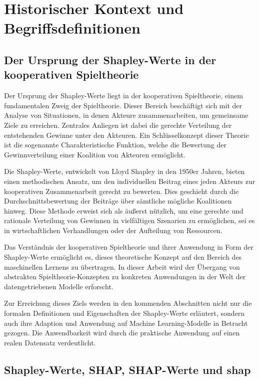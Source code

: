 \chapter{Historischer Kontext und Begriffsdefinitionen}



\section{Der Ursprung der Shapley-Werte in der kooperativen Spieltheorie}

Der Ursprung der Shapley-Werte liegt in der kooperativen Spieltheorie, einem fundamentalen Zweig der Spieltheorie. 
Dieser Bereich beschäftigt sich mit der Analyse von Situationen, in denen Akteure zusammenarbeiten, um gemeinsame Ziele zu erreichen. 
Zentrales Anliegen ist dabei die gerechte Verteilung der entstehenden Gewinne unter den Akteuren. Ein Schlüsselkonzept dieser Theorie 
ist die sogenannte \glqq{}Charakteristische Funktion\grqq{}, welche die Bewertung der Gewinnverteilung einer Koalition von Akteuren ermöglicht.

Die Shapley-Werte, entwickelt von Lloyd Shapley in den 1950er Jahren, bieten einen methodischen Ansatz, um den individuellen Beitrag 
eines jeden Akteurs zur kooperativen Zusammenarbeit gerecht zu bewerten. Dies geschieht durch die Durchschnittsbewertung der Beiträge 
über sämtliche mögliche Koalitionen hinweg. Diese Methode erweist sich als äußerst nützlich, um eine gerechte und rationale Verteilung 
von Gewinnen in vielfältigen Szenarien zu ermöglichen, sei es in wirtschaftlichen Verhandlungen oder der Aufteilung von Ressourcen.

Das Verständnis der kooperativen Spieltheorie und ihrer Anwendung in Form der Shapley-Werte ermöglicht es, dieses theoretische Konzept 
auf den Bereich des maschinellen Lernens zu übertragen. In dieser Arbeit wird der Übergang von abstrakten Spieltheorie-Konzepten 
zu konkreten Anwendungen in der Welt der datengetriebenen Modelle erforscht.

Zur Erreichung dieses Ziels werden in den kommenden Abschnitten nicht nur die formalen Definitionen und Eigenschaften der Shapley-Werte 
erläutert, sondern auch ihre Adaption und Anwendung auf Machine Learning-Modelle in Betracht gezogen. Die Anwendbarkeit wird durch die 
praktische Anwendung auf einen realen Datensatz verdeutlicht.


\section{Shapley-Werte, SHAP, SHAP-Werte und \textsf{shap}}

